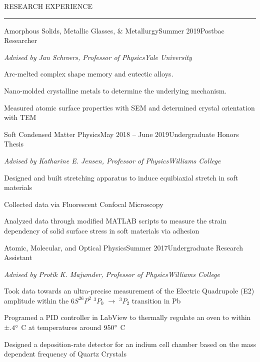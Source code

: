 \documentclass{resume} %
\renewenvironment{rSection}[1]{
	\sectionskip
	\textcolor{RoyalPurple}{\MakeUppercase{#1}}
	\sectionlineskip
	\hrule
	\begin{list}{}{
			\setlength{\leftmargin}{1.5em}
		}
		\item[]
	}{
	\end{list}
}
\begin{document}
\vspace{-1em}
	\begin{rSection}{Research Experience}
		\begin{rSubsection}{Amorphous Solids, Metallic Glasses, \& Metallurgy}{Summer 2019}{Postbac Researcher}{}
			\vspace{-.5em}
			\item[] {\em Advised by Jan Schroers, Professor of Physics}\hfill {\em Yale University}
			\item Arc-melted complex shape memory and eutectic alloys.
			\item Nano-molded crystalline metals to determine the underlying mechanism.
			\item Measured atomic surface properties with SEM and determined crystal orientation with TEM
		\end{rSubsection}


		\begin{rSubsection}{Soft Condensed Matter Physics}{May 2018 -- June 2019}{Undergraduate Honors Thesis}{}
			\vspace{-.5em}
				\item[] {\em Advised by Katharine E. Jensen, Professor of Physics}\hfill {\em Williams College}
				\item Designed and built stretching apparatus to induce equibiaxial stretch in soft materials
				\item Collected data via Fluorescent Confocal Microscopy 
				\item Analyzed data through modified MATLAB scripts to measure the strain dependency of solid surface stress in soft materials via adhesion

		\end{rSubsection}

		\pagebreak

		\begin{rSubsection}{Atomic, Molecular, and Optical Physics}{Summer 2017}{Undergraduate Research Assistant}{}
			\vspace{-.5em}
			\item[] {\em Advised by Protik K. Majumder, Professor of Physics}\hfill {\em Williams College}
			\item Took data towards an ultra-precise  measurement of the Electric Quadrupole (E2) amplitude within the $6S^26P^2$ $^3P_0$ $\rightarrow$ $^3P_2$ transition in Pb
			\item Programed a PID controller in LabView to thermally regulate an oven to within $\pm .4\degree$ C at temperatures around $ 950\degree $ C
			\item Designed a deposition-rate detector for an indium cell chamber based on the mass dependent frequency of Quartz Crystals
		\end{rSubsection}

\end{rSection}
\end{document}
